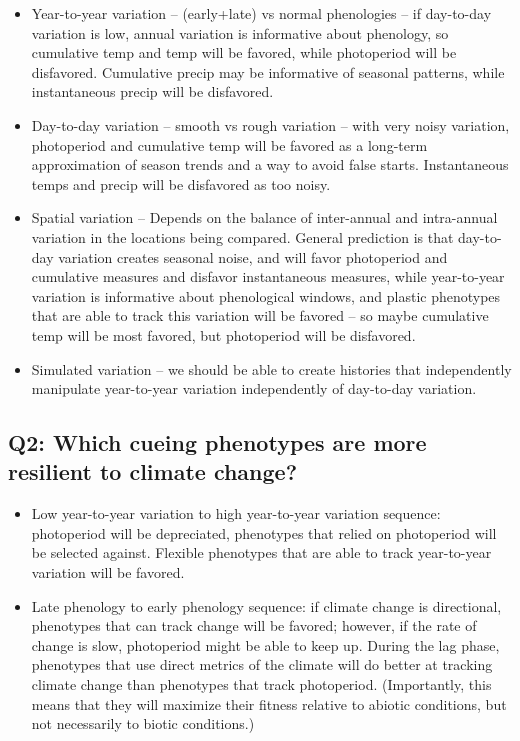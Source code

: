 \documentclass[11pt,a4paper]{article}
\begin{document}
\begin{itemize}
\item Year-to-year variation – (early+late) vs normal phenologies – if day-to-day variation is low, annual variation is informative about phenology, so cumulative temp and temp will be favored, while photoperiod will be disfavored. Cumulative precip may be informative of seasonal patterns, while instantaneous precip will be disfavored. 
\item Day-to-day variation – smooth vs rough variation – with very noisy variation, photoperiod and cumulative temp will be favored as a long-term approximation of season trends and a way to avoid false starts. Instantaneous temps and precip will be disfavored as too noisy. 
\item Spatial variation – Depends on the balance of inter-annual and intra-annual variation in the locations being compared. General prediction is that day-to-day variation creates seasonal noise, and will favor photoperiod and cumulative measures and disfavor instantaneous measures, while year-to-year variation is informative about phenological windows, and plastic phenotypes that are able to track this variation will be favored – so maybe cumulative temp will be most favored, but photoperiod will be disfavored. 
\item Simulated variation – we should be able to create histories that independently manipulate year-to-year variation independently of day-to-day variation. 
\end{itemize}

\subsection{Q2: Which cueing phenotypes are more resilient to climate change?}

\begin{itemize}
\item Low year-to-year variation to high year-to-year variation sequence: photoperiod will be depreciated, phenotypes that relied on photoperiod will be selected against. Flexible phenotypes that are able to track year-to-year variation will be favored.
\item Late phenology to early phenology sequence: if climate change is directional, phenotypes that can track change will be favored; however, if the rate of change is slow, photoperiod might be able to keep up. During the lag phase, phenotypes that use direct metrics of the climate will do better at tracking climate change than phenotypes that track photoperiod. (Importantly, this means that they will maximize their fitness relative to abiotic conditions, but not necessarily to biotic conditions.)
\end{itemize}
\end{document}
